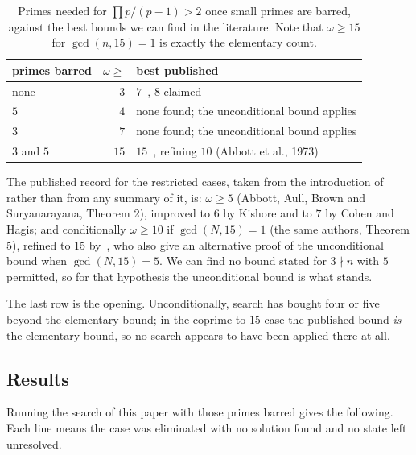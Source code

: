 \documentclass[11pt]{amsart}
\theoremstyle{remark}
\begin{document}
\begin{table}[h]
\centering
\begin{tabular}{lrl}
\toprule
primes barred & $\omega \ge$ & best published \\
\midrule
none      & $3$  & $7$~\cite{hagiscohen}, $8$ claimed~\cite{tty} \\
$5$       & $4$  & none found; the unconditional bound applies \\
$3$       & $7$  & none found; the unconditional bound applies \\
$3$ and $5$ & $15$ & $15$~\cite{prasad}, refining $10$ (Abbott et al., 1973) \\
\bottomrule
\end{tabular}
\caption{Primes needed for $\prod p/(p-1) > 2$ once small primes are barred,
against the best bounds we can find in the literature. Note that
$\omega \ge 15$ for $\gcd(n,15) = 1$ is exactly the elementary count.}
\end{table}

The published record for the restricted cases, taken from the introduction
of~\cite{prasad} rather than from any summary of it, is: $\omega \ge 5$ (Abbott,
Aull, Brown and Suryanarayana, Theorem 2), improved to $6$ by Kishore and to $7$
by Cohen and Hagis; and conditionally $\omega \ge 10$ if $\gcd(N,15) = 1$ (the
same authors, Theorem 5), refined to $15$ by~\cite{prasad}, who also give an
alternative proof of the unconditional bound when $\gcd(N,15) = 5$. We can find
no bound stated for $3 \nmid n$ with $5$ permitted, so for that hypothesis the
unconditional bound is what stands.

The last row is the opening. Unconditionally, search has bought four or five
beyond the elementary bound; in the coprime-to-$15$ case the published bound
\emph{is} the elementary bound, so no search appears to have been applied there
at all.

\subsection{Results}
Running the search of this paper with those primes barred gives the following.
Each line means the case was eliminated with no solution found and no state left
unresolved.
\end{document}

